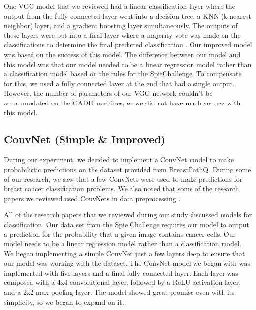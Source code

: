\documentclass[11pt]{ieeeconf}
\begin{document}
One VGG model that we reviewed had a linear classification layer where the output from the fully connected layer went into a decision tree, a KNN (k-nearest neighbor) layer, and a gradient boosting layer simultaneously. The outputs of these layers were put into a final layer where a majority vote was made on the classifications to determine the final predicted classification \cite{sanket}. Our improved model was based on the success of this model. The difference between our model and this model was that our model needed to be a linear regression model rather than a classification model based on the rules for the SpieChallenge. To compensate for this, we used a fully connected layer at the end that had a single output. However, the number of parameters of our VGG network couldn’t be accommodated on the CADE machines, so we did not have much success with this model. 

\subsection{ConvNet (Simple \& Improved)}
During our experiment, we decided to implement a ConvNet model to make probabilistic predictions on the dataset provided from BreastPathQ. During some of our research, we saw that a few ConvNets were used to make predictions for breast cancer classification problems. We also noted that some of the research papers we reviewed used ConvNets in data preprocessing \cite{hamidreza}.

All of the research papers that we reviewed during our study discussed models for classification. Our data set from the Spie Challenge requires our model to output a prediction for the probability that a given image contains cancer cells. Our model needs to be a linear regression model rather than a classification model. We began implementing a simple ConvNet just a few layers deep to ensure that our model was working with the dataset. The ConvNet model we began with was implemented with five layers and a final fully connected layer. Each layer was composed with a 4x4 convolutional layer, followed by a ReLU activation layer, and a 2x2 max pooling layer. The model showed great promise even with its simplicity, so we began to expand on it.
\end{document}
